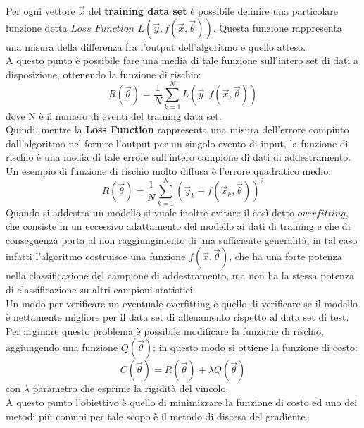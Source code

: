 Per ogni vettore $\vec{x}$ del \textbf{training data set} è possibile definire una particolare funzione detta $\textit{Loss Function}$ $L(\vec{y},f(\vec{x},\vec{\theta}))$. Questa funzione rappresenta una misura della differenza fra l'output dell'algoritmo e quello atteso.\\ 
A questo punto è possibile fare una media di tale funzione sull'intero set di dati a disposizione, ottenendo la funzione di rischio: \\
\begin{equation}
R(\vec{\theta}) = \frac{1}{N}\sum_{k=1}^{N}L(\vec{y},f(\vec{x},\vec{\theta}))
\end{equation}
dove N è il numero di eventi del training data set. \\
Quindi, mentre la \textbf{Loss Function} rappresenta una misura dell'errore compiuto dall'algoritmo nel fornire l'output per un singolo evento di input, la funzione di rischio è una media di tale errore sull'intero campione di dati di addestramento.\\
Un esempio di funzione di rischio molto diffusa è l'errore quadratico medio:
\begin{equation}
R(\vec{\theta}) = \frac{1}{N}\sum_{k=1}^{N}(\vec{y}_k - f(\vec{x}_k , \vec{\theta}))^2
\end{equation}
Quando si addestra un modello si vuole inoltre evitare il così detto $\textit{overfitting}$, che consiste in un eccessivo adattamento del modello ai dati di training e che di conseguenza porta al non raggiungimento di una sufficiente generalità; in tal caso infatti l'algoritmo costruisce una funzione $f(\vec{x},\vec{\theta})$, che ha una forte potenza nella classificazione del campione di addestramento, ma non ha la stessa potenza di classificazione su altri campioni statistici. \\
Un modo per verificare un eventuale overfitting è quello di verificare se il modello è nettamente migliore per il data set di allenamento rispetto al data set di test. \\
Per arginare questo problema è possibile modificare la funzione di rischio, aggiungendo una funzione $Q(\vec{\theta})$; in questo modo si ottiene la funzione di costo:
\begin{equation}
C(\vec{\theta}) = R(\vec{\theta}) + \lambda Q(\vec{\theta})
\end{equation}
con $\lambda$ parametro che esprime la rigidità del vincolo.\\
A questo punto l'obiettivo è quello di minimizzare la funzione di costo ed uno dei metodi più comuni per tale scopo è il metodo di discesa del gradiente.\\
